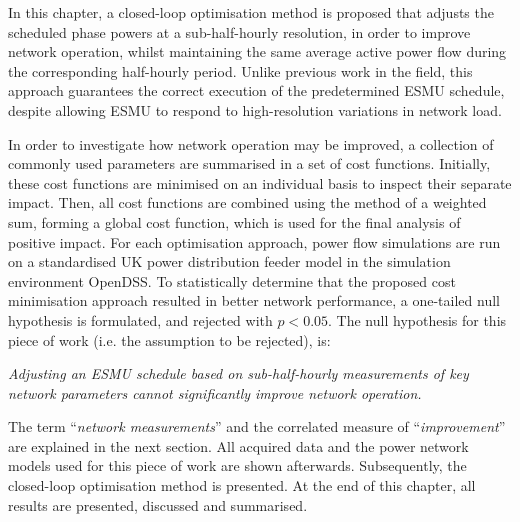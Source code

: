 In this chapter, a closed-loop optimisation method is proposed that adjusts the scheduled phase powers at a sub-half-hourly resolution, in order to improve network operation, whilst maintaining the same average active power flow during the corresponding half-hourly period.
Unlike previous work in the field, this approach guarantees the correct execution of the predetermined ESMU schedule, despite allowing ESMU to respond to high-resolution variations in network load.

In order to investigate how network operation may be improved, a collection of commonly used parameters are summarised in a set of cost functions.
Initially, these cost functions are minimised on an individual basis to inspect their separate impact.
Then, all cost functions are combined using the method of a weighted sum, forming a global cost function, which is used for the final analysis of positive impact.
For each optimisation approach, power flow simulations are run on a standardised UK power distribution feeder model in the simulation environment OpenDSS.
To statistically determine that the proposed cost minimisation approach resulted in better network performance, a one-tailed null hypothesis is formulated, and rejected with $p<0.05$.
The null hypothesis for this piece of work (i.e. the assumption to be rejected), is:

\textit{Adjusting an ESMU schedule based on sub-half-hourly measurements of key network parameters cannot significantly improve network operation.}

The term ``\textit{network measurements}'' and the correlated measure of ``\textit{improvement}'' are explained in the next section.
All acquired data and the power network models used for this piece of work are shown afterwards.
Subsequently, the closed-loop optimisation method is presented.
At the end of this chapter, all results are presented, discussed and summarised.

